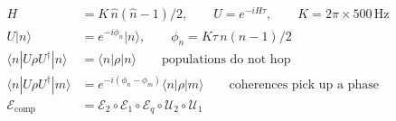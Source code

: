 \documentclass[12pt]{article}
\begin{document}
\fontsize{20}{26}\selectfont
\begin{align*}
H &= K\,\hat n(\hat n-1)/2,
  \qquad
  U=e^{-i H\tau},
  \qquad
  K=2\pi\times 500\,\mathrm{Hz} \\[0.45em]
U|n\rangle
  &= e^{-i\phi_n}|n\rangle,
  \qquad
  \phi_n = K\tau\, n(n-1)/2 \\[0.45em]
\langle n|U\rho U^\dagger|n\rangle
  &= \langle n|\rho|n\rangle
  \qquad\text{populations do not hop} \\[0.45em]
\langle n|U\rho U^\dagger|m\rangle
  &= e^{-i(\phi_n-\phi_m)}\langle n|\rho|m\rangle
  \qquad\text{coherences pick up a phase} \\[0.55em]
\mathcal{E}_{\mathrm{comp}}
  &= \mathcal{E}_2\circ\mathcal{E}_1\circ\mathcal{E}_q
     \circ\mathcal{U}_2\circ\mathcal{U}_1
\end{align*}
\end{document}
